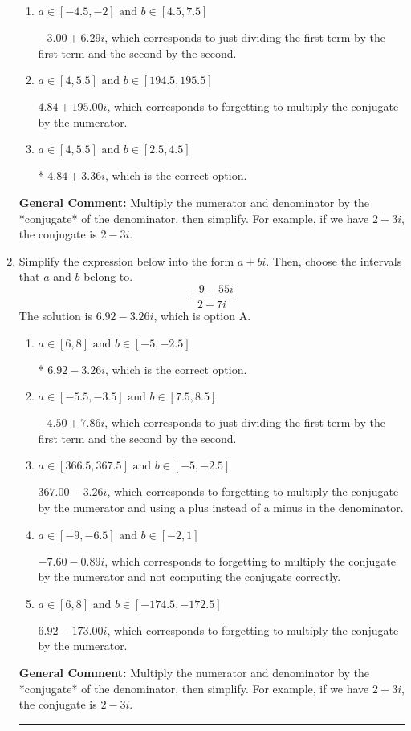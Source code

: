 \documentclass{extbook}[14pt]
\newcommand{\litem}[1]{\item #1

\rule{\textwidth}{0.4pt}}
\begin{document}
\begin{enumerate}
{\begin{enumerate}[label=\Alph*.]
 $281.00  + 3.36 i$, which corresponds to forgetting to multiply the conjugate by the numerator and using a plus instead of a minus in the denominator.
\item \( a \in [-4.5, -2] \text{ and } b \in [4.5, 7.5] \)

 $-3.00  + 6.29 i$, which corresponds to just dividing the first term by the first term and the second by the second.
\item \( a \in [4, 5.5] \text{ and } b \in [194.5, 195.5] \)

 $4.84  + 195.00 i$, which corresponds to forgetting to multiply the conjugate by the numerator.
\item \( a \in [4, 5.5] \text{ and } b \in [2.5, 4.5] \)

* $4.84  + 3.36 i$, which is the correct option.
\end{enumerate}

\textbf{General Comment:} Multiply the numerator and denominator by the *conjugate* of the denominator, then simplify. For example, if we have $2+3i$, the conjugate is $2-3i$.
}
\litem{
Simplify the expression below into the form $a+bi$. Then, choose the intervals that $a$ and $b$ belong to.
\[ \frac{-9 - 55 i}{2 - 7 i} \]The solution is \( 6.92  - 3.26 i \), which is option A.\begin{enumerate}[label=\Alph*.]
\item \( a \in [6, 8] \text{ and } b \in [-5, -2.5] \)

* $6.92  - 3.26 i$, which is the correct option.
\item \( a \in [-5.5, -3.5] \text{ and } b \in [7.5, 8.5] \)

 $-4.50  + 7.86 i$, which corresponds to just dividing the first term by the first term and the second by the second.
\item \( a \in [366.5, 367.5] \text{ and } b \in [-5, -2.5] \)

 $367.00  - 3.26 i$, which corresponds to forgetting to multiply the conjugate by the numerator and using a plus instead of a minus in the denominator.
\item \( a \in [-9, -6.5] \text{ and } b \in [-2, 1] \)

 $-7.60  - 0.89 i$, which corresponds to forgetting to multiply the conjugate by the numerator and not computing the conjugate correctly.
\item \( a \in [6, 8] \text{ and } b \in [-174.5, -172.5] \)

 $6.92  - 173.00 i$, which corresponds to forgetting to multiply the conjugate by the numerator.
\end{enumerate}

\textbf{General Comment:} Multiply the numerator and denominator by the *conjugate* of the denominator, then simplify. For example, if we have $2+3i$, the conjugate is $2-3i$.
}
\end{enumerate}
\end{document}
